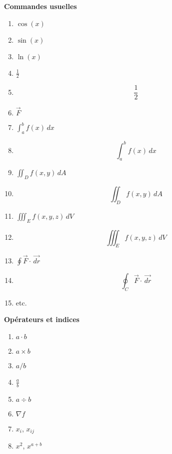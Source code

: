 \documentclass[letterpaper,12pt,oneside,final]{book}
\begin{document}
{\bf Commandes usuelles}

\smallskip

\begin{enumerate}

\item $\cos(x)$

\item $\sin(x)$

\item $\ln(x)$

\item $\frac{1}{2}$

\item \[\frac{1}{2}\]

\item $\vec{F}$

\item $\int_{a}^{b} f(x)\, dx$

\item \[\int_{a}^{b} f(x)\, dx\]

\item $\iint_D f(x,y)\, dA$

\item \[\iint_D f(x,y)\, dA\]

\item $\iiint_E f(x,y,z)\, dV$

\item \[\iiint_E f(x,y,z)\, dV\]

\item $\oint \vec{F} \cdot \,\vec{dr}$

\item \[\oint_C \vec{F} \cdot \,\vec{dr}\] 

\item etc.

\end{enumerate}

\smallskip


{\bf Op\'erateurs et indices}

\begin{enumerate}

\item $a \cdot b$

\item $a \times b$

\item $a/b$

\item $\frac{a}{b}$

\item $a \div b$

\item $\nabla f$

\item $x_i$, $x_{ij}$

\item $x^2$, $x^{a+b}$

\end{enumerate}
\end{document}
